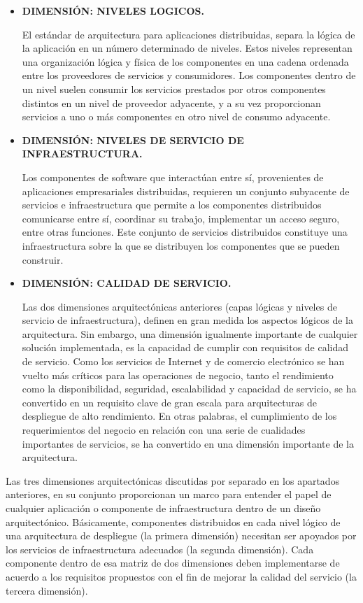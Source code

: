 \documentclass{memoria}
\begin{document}
\begin{itemize}
\item \textbf{DIMENSIÓN: NIVELES LOGICOS.}

El estándar de arquitectura para aplicaciones distribuidas, separa la lógica de la aplicación en un número determinado de niveles. Estos niveles representan una organización lógica y física de los componentes en una cadena ordenada entre los proveedores de servicios y consumidores. Los componentes dentro de un nivel suelen consumir los servicios prestados por otros componentes distintos en un nivel de proveedor adyacente, y a su vez proporcionan servicios a uno o más componentes en otro nivel de consumo adyacente.
\newpage

\item \textbf{DIMENSIÓN: NIVELES DE SERVICIO DE INFRAESTRUCTURA.}

Los componentes de software que interactúan entre sí, provenientes de aplicaciones empresariales distribuidas, requieren un conjunto subyacente de servicios e  infraestructura que permite a los componentes distribuidos comunicarse entre sí, coordinar su trabajo, implementar un acceso seguro, entre otras funciones. Este conjunto de servicios distribuidos constituye una infraestructura sobre la que se distribuyen los componentes que se pueden construir.

\item \textbf{DIMENSIÓN: CALIDAD DE SERVICIO.}

Las dos dimensiones arquitectónicas anteriores (capas lógicas y niveles de servicio de infraestructura), definen en gran medida los aspectos lógicos de la arquitectura. Sin embargo, una dimensión igualmente importante de cualquier solución implementada, es la capacidad de cumplir con requisitos de calidad de servicio. Como los servicios de Internet y de comercio electrónico se han vuelto más críticos para las operaciones de negocio, tanto el rendimiento como la disponibilidad, seguridad, escalabilidad y capacidad de servicio, se ha convertido en un requisito clave de gran escala para arquitecturas de despliegue de alto rendimiento. En otras palabras, el cumplimiento de los requerimientos del negocio en relación con una serie de cualidades importantes de servicios, se ha convertido en una dimensión importante de la arquitectura. 
\end{itemize}

Las tres dimensiones arquitectónicas discutidas por separado en los apartados anteriores, en su conjunto proporcionan un marco para entender el papel de cualquier aplicación o componente de infraestructura dentro de un diseño arquitectónico. Básicamente, componentes distribuidos en cada nivel lógico de una arquitectura de despliegue (la primera dimensión) necesitan ser apoyados por los servicios de infraestructura adecuados (la segunda dimensión). Cada componente dentro de esa matriz de dos dimensiones deben implementarse de acuerdo a los requisitos propuestos con el fin de mejorar la  calidad del servicio (la tercera dimensión).
\end{document}
